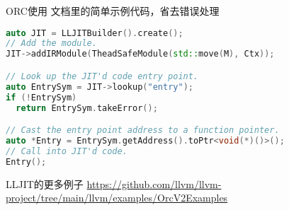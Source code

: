 \documentclass[
  8pt,
  ignorenonframetext,
  aspectratio=169]{beamer}
\begin{document}
\begin{frame}[fragile]{ORC使用}
\protect\hypertarget{orcux4f7fux7528}{}
文档里的简单示例代码，省去错误处理

\begin{lstlisting}[language=c++,]
auto JIT = LLJITBuilder().create();
// Add the module.
JIT->addIRModule(TheadSafeModule(std::move(M), Ctx));

// Look up the JIT'd code entry point.
auto EntrySym = JIT->lookup("entry");
if (!EntrySym)
  return EntrySym.takeError();

// Cast the entry point address to a function pointer.
auto *Entry = EntrySym.getAddress().toPtr<void(*)()>();
// Call into JIT'd code.
Entry();
\end{lstlisting}

LLJIT的更多例子
\url{https://github.com/llvm/llvm-project/tree/main/llvm/examples/OrcV2Examples}
\end{frame}
\end{document}
